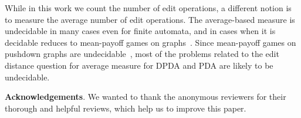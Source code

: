 \documentclass{CSML}
\begin{document}
While in this work we count the number of edit operations, a different notion is
to measure the average number of edit operations. 
The average-based measure is undecidable in many cases even for finite automata,
and in cases when it is decidable reduces to mean-payoff games on graphs~\cite{limavgRiveros}.
Since mean-payoff games on pushdown graphs are undecidable~\cite{CV12}, most of the problems 
related to the edit distance question for average measure for DPDA and PDA are likely
to be undecidable.


\noindent\textbf{Acknowledgements}. We wanted to thank the anonymous reviewers for their thorough and helpful
reviews, which help us to improve this paper.



\end{document}

